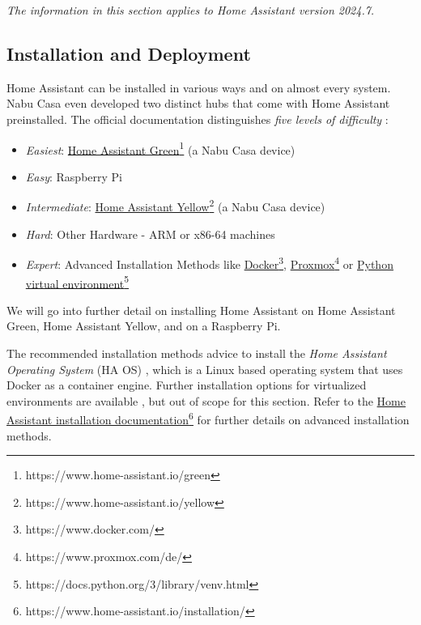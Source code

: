 \begin{center}
    \textit{The information in this section applies to Home Assistant version 2024.7.}
\end{center}

\subsection{Installation and Deployment}
\label{sec:ha-installation}

Home Assistant can be installed in various ways and on almost every system. Nabu Casa even developed two distinct hubs that come with Home Assistant preinstalled. The official documentation distinguishes \textit{five levels of difficulty} \cite{HomeAssistant_Docs_Installation}:

\begin{itemize}
    \item \textit{Easiest}: \href{https://www.home-assistant.io/green}{Home Assistant Green}\footnote{https://www.home-assistant.io/green} (a Nabu Casa device)
    \item \textit{Easy}: Raspberry Pi
    \item \textit{Intermediate}: \href{https://www.home-assistant.io/yellow}{Home Assistant Yellow}\footnote{https://www.home-assistant.io/yellow} (a Nabu Casa device)
    \item \textit{Hard}: Other Hardware - ARM or x86-64 machines
    \item \textit{Expert}: Advanced Installation Methods like \href{https://www.docker.com/}{Docker}\footnote{https://www.docker.com/}, \href{https://www.proxmox.com/de/}{Proxmox}\footnote{https://www.proxmox.com/de/} or \href{https://docs.python.org/3/library/venv.html}{Python virtual environment}\footnote{https://docs.python.org/3/library/venv.html}
\end{itemize}

\noindent
We will go into further detail on installing Home Assistant on Home Assistant Green, Home Assistant Yellow, and on a Raspberry Pi.

The recommended installation methods advice to install the \textit{Home Assistant Operating System} (HA OS) \cite{HomeAssistant_HassOS_github}, which is a Linux based operating system that uses Docker as a container engine. Further installation options for virtualized environments are available \cite{HomeAssistant_Docs_Installation}, but out of scope for this section. Refer to the \href{https://www.home-assistant.io/installation/}{Home Assistant installation documentation}\footnote{https://www.home-assistant.io/installation/} for further details on advanced installation methods.


